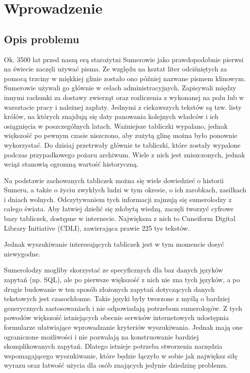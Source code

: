 \chapter*{Wprowadzenie}

 

\section*{Opis problemu}
Ok. 3500 lat przed naszą erą starożytni Sumerowie jako prawdopodobnie pierwsi na świecie zaczęli używać pisma. Ze względu na ksztat liter odciśniętych za pomocą trzciny w miękkiej glinie zostało ono później nazwane pismem klinowym. Sumerowie używali go głównie w celach administracyjnych. Zapisywali między innymi rachunki za dostawy zwierząt oraz rozliczenia z wykonanej na polu lub w warsztacie pracy i należnej zapłaty. Jednymi z ciekawszych tekstów są tzw. listy królów, na których znajdują się daty panowania kolejnych władców i ich osiągnięcia w poszczególnych latach. 
Ważniejsze tabliczki wypalano, jednak większość po pewnym czasie niszczono, aby zużytą glinę można było ponownie wykorzystać. Do dzisiaj przetrwały głównie te tabliczki, które zostały wypalone podczas przypadkowego pożaru archiwum. Wiele z nich jest zniszczonych, jednak wciąż stanowią ogromną wartość historyczną. 
 
Na podstawie zachowanych tabliczek można się wiele dowiedzieć o historii Sumeru, a także o życiu zwykłych ludzi w tym okresie, o ich zarobkach, zasiłkach i dniach wolnych. Odczytywaniem tych informacji zajmują się sumerolodzy z całego świata. Aby łatwiej dzielić się zdobytą wiedzą, zaczęli tworzyć cyfrowe bazy tabliczek, dostępne w internecie. Największa z nich to Cuneiform Digital Library Initiative (CDLI), zawierająca prawie 225 tys tekstów.

Jednak wyszukiwanie interesujących tabliczek jest w tym momencie dosyć niewygodne. 

Sumerolodzy mogliby skorzystać ze specyficznych dla baz danych języków zapytań (np. SQL), ale po pierwsze większość z nich nie zna tych języków, a po drugie budowanie w ten sposób złożonych zapytań dotyczących danych tekstowych jest czasochłonne. Takie języki były tworzone z myślą o bardziej generycznych zastosowaniach i nie odpowiadają potrzebom sumerologów.
Z tych powodów większość istniejących obecnie serwisów internetowych udostępnia formularze ułatwiające wprowadzanie kryteriów wyszukiwania. Jednak mają one ograniczone możliwości i nie pozwalają na konstruowanie bardziej skomplikowanych zapytań.
Dlatego istnieje potrzeba stworzenia narzędzia wspomagającego wyszukiwanie, które będzie łączyło w sobie jak największ siłę wyrazu oraz łatwość użycia dla osób znających jedynie dziedzinę problemu.

